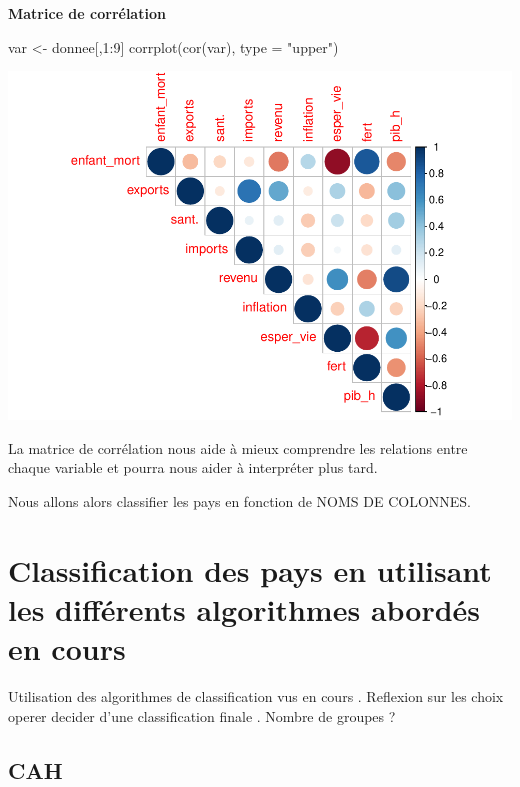 \documentclass[
]{article}
\newenvironment{Shaded}{}{}
\newcommand{\AttributeTok}[1]{#1}
\newcommand{\DecValTok}[1]{#1}
\newcommand{\FunctionTok}[1]{#1}
\newcommand{\NormalTok}[1]{#1}
\newcommand{\OtherTok}[1]{\textcolor[rgb]{1.00,0.25,0.00}{#1}}
\newcommand{\SpecialCharTok}[1]{\textcolor[rgb]{0.00,0.50,0.50}{#1}}
\newcommand{\StringTok}[1]{\textcolor[rgb]{0.00,0.50,0.50}{#1}}
\begin{document}
\textbf{Matrice de corrélation}

\begin{Shaded}
\begin{Highlighting}[]
\NormalTok{var }\OtherTok{\textless{}{-}}\NormalTok{ donnee[,}\DecValTok{1}\SpecialCharTok{:}\DecValTok{9}\NormalTok{]}
\FunctionTok{corrplot}\NormalTok{(}\FunctionTok{cor}\NormalTok{(var), }\AttributeTok{type =} \StringTok{"upper"}\NormalTok{)}
\end{Highlighting}
\end{Shaded}

\includegraphics{Projet_files/figure-latex/unnamed-chunk-10-1.pdf}

La matrice de corrélation nous aide à mieux comprendre les relations
entre chaque variable et pourra nous aider à interpréter plus tard.

Nous allons alors classifier les pays en fonction de NOMS DE COLONNES.

\hypertarget{classification-des-pays-en-utilisant-les-diffuxe9rents-algorithmes-aborduxe9s-en-cours}{%
\section{Classification des pays en utilisant les différents algorithmes
abordés en
cours}\label{classification-des-pays-en-utilisant-les-diffuxe9rents-algorithmes-aborduxe9s-en-cours}}

Utilisation des algorithmes de classification vus en cours . Reflexion
sur les choix operer decider d'une classification finale . Nombre de
groupes ?

\hypertarget{cah}{%
\subsection{CAH}\label{cah}}
\end{document}
